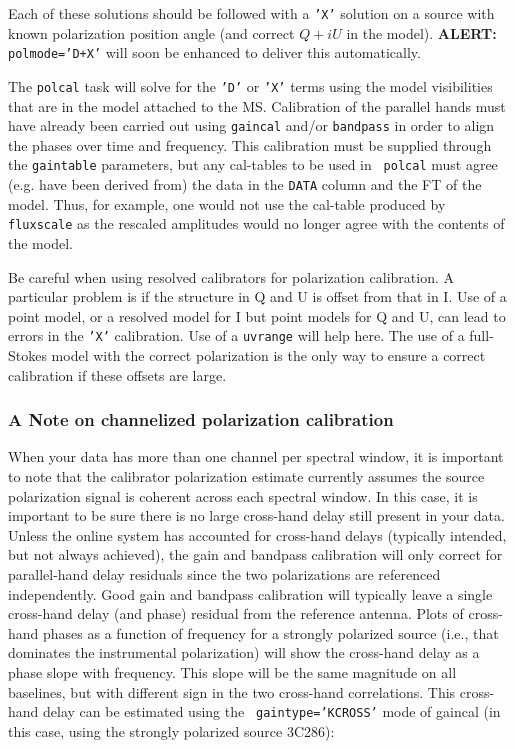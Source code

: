 Each of these solutions should be followed with a {\tt 'X'} solution
on a source with known polarization position angle (and correct $Q+iU$
in the model).  
{\bf ALERT:} {\tt polmode='D+X'} will soon be enhanced to 
deliver this automatically.
           
The {\tt polcal} task will solve for the {\tt 'D'} or {\tt 'X'} terms
using the model visibilities that are in the model attached to the MS.
Calibration of the parallel hands must have already been carried out
using {\tt gaincal} and/or {\tt bandpass} in order to align the phases
over time and frequency.  This calibration must be supplied through
the {\tt gaintable} parameters, but any cal-tables to be used in {\tt
  polcal} must agree (e.g. have been derived from) the data in the
{\tt DATA} column and the FT of the model.  Thus, for example, one
would not use the cal-table produced by {\tt fluxscale} as the
rescaled amplitudes would no longer agree with the contents of the model.

Be careful when using resolved calibrators for polarization
calibration.  A particular problem is if the structure in Q and U is
offset from that in I.  Use of a point model, or a resolved model for
I but point models for Q and U, can lead to errors in the {\tt 'X'} 
calibration.  Use of a {\tt uvrange} will help here.  The use of a
full-Stokes model with the correct polarization is the only way to 
ensure a correct calibration if these offsets are large.

\subsubsection{A Note on channelized polarization calibration}

When your data has more than one channel per spectral window, it is
important to note that the calibrator polarization estimate currently
assumes the source polarization signal is coherent across each
spectral window.  In this case, it is important to be sure there is no
large cross-hand delay still present in your data.  Unless the online
system has accounted for cross-hand delays (typically intended, but
not always achieved), the gain and bandpass calibration will only
correct for parallel-hand delay residuals since the two polarizations
are referenced independently.  Good gain and bandpass calibration will
typically leave a single cross-hand delay (and phase) residual from
the reference antenna.  Plots of cross-hand phases as a function of
frequency for a strongly polarized source (i.e., that dominates the
instrumental polarization) will show the cross-hand delay as a phase
slope with frequency.  This slope will be the same magnitude on all
baselines, but with different sign in the two cross-hand correlations.
This cross-hand delay can be estimated using the {\tt
gaintype='KCROSS'} mode of gaincal (in this case, using the strongly
polarized source 3C286):

